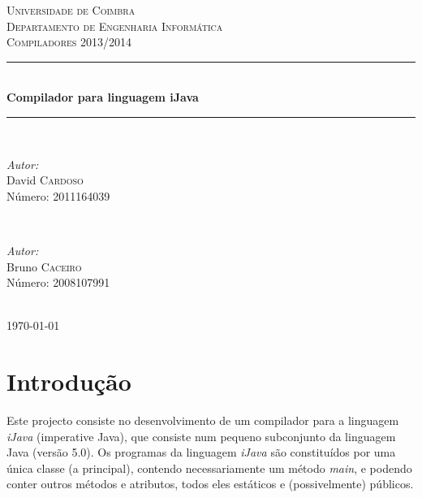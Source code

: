 \documentclass[12pt]{article}
\begin{document}
\renewcommand*\contentsname{Índice}

\begin{titlepage}

\newcommand{\HRule}{\rule{\linewidth}{0.5mm}} 
\center 
 

\textsc{\LARGE Universidade de Coimbra}\\[1.5cm] %
\textsc{\Large Departamento de Engenharia Informática}\\[4cm] %
\textsc{\large Compiladores 2013/2014}\\[1cm] %


\HRule \\[0.5cm]
{ \huge \bfseries Compilador para linguagem iJava}\\[0.4cm] 
\HRule \\[8cm]
 
\begin{minipage}{0.4\textwidth}
\begin{flushleft} \large
\emph{Autor:}\\
David \textsc{Cardoso}  \\Número: 2011164039
\end{flushleft}
\end{minipage}
~
\begin{minipage}{0.4\textwidth}

\begin{flushright} \large
\emph{Autor:} \\
Bruno \textsc{Caceiro}  \\Número: 2008107991
\end{flushright}
\end{minipage}\\[2cm]

{\large \today}\\[3cm]

\vfill

\end{titlepage}


\tableofcontents
\vfill
\pagebreak


\section{Introdução}
Este projecto consiste no desenvolvimento de um compilador para a linguagem \emph{iJava} (imperative Java), que consiste num pequeno subconjunto da linguagem Java (versão 5.0). Os programas da linguagem \emph{iJava} são constituídos por uma única classe (a principal), contendo necessariamente um método \emph{main}, e podendo conter outros métodos e atributos, todos eles estáticos e (possivelmente) públicos.
\end{document}
